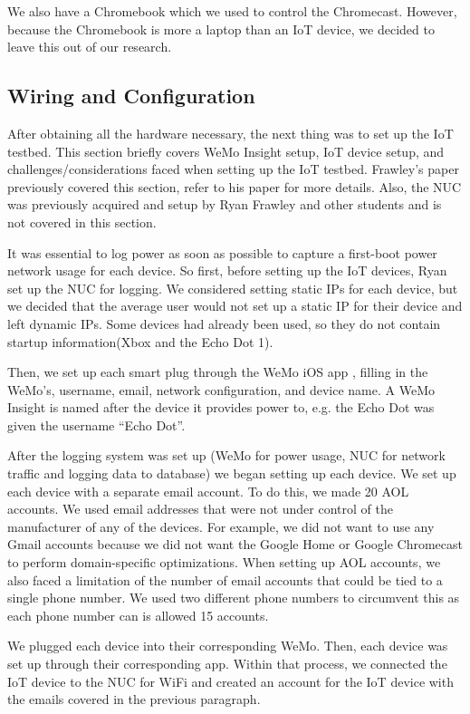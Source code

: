 We also have a Chromebook which we used to control the Chromecast. However, because the Chromebook is more a laptop than an IoT device, we decided to leave this out of our research.

\subsection{Wiring and Configuration}
\label{Wiring and Configuration}
After obtaining all the hardware necessary, the next thing was to set up the IoT testbed. This section briefly covers WeMo Insight setup, IoT device setup, and challenges/considerations faced when setting up the IoT testbed. Frawley's paper \cite{frawley_2018} previously covered this section, refer to his paper for more details. Also, the NUC was previously acquired and setup by Ryan Frawley and other students and is not covered in this section.

It was essential to log power as soon as possible to capture a first-boot power network usage for each device. So first, before setting up the IoT devices, Ryan set up the NUC for logging. We considered setting static IPs for each device, but we decided that the average user would not set up a static IP for their device and left dynamic IPs. Some devices had already been used, so they do not contain startup information(Xbox and the Echo Dot 1).

Then, we set up each smart plug through the WeMo iOS app \cite{wemoApp}, filling in the WeMo's, username, email, network configuration, and device name. A WeMo Insight is named after the device it provides power to, e.g. the Echo Dot was given the username ``Echo Dot''.

After the logging system was set up (WeMo for power usage, NUC for network traffic and logging data to database) we began setting up each device. We set up each device with a separate email account. To do this, we made 20 AOL accounts. We used email addresses that were not under control of the manufacturer of any of the devices. For example, we did not want to use any Gmail accounts because we did not want the Google Home or Google Chromecast to perform domain-specific optimizations. When setting up AOL accounts, we also faced a limitation of the number of email accounts that could be tied to a single phone number. We used two different phone numbers to circumvent this as each phone number can is allowed 15 accounts.

We plugged each device into their corresponding WeMo. Then, each device was set up through their corresponding app. Within that process, we connected the IoT device to the NUC for WiFi and created an account for the IoT device with the emails covered in the previous paragraph.

